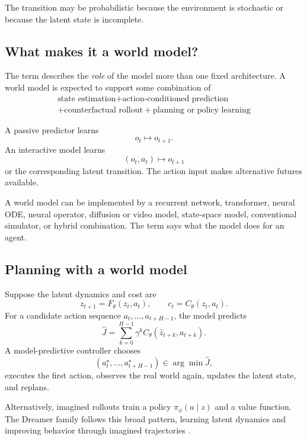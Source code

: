 \documentclass[11pt]{article}
\begin{document}
The transition may be probabilistic because the environment is stochastic or because the latent state is incomplete.

\subsection{What makes it a world model?}

The term describes the \emph{role} of the model more than one fixed architecture. A world model is expected to support some combination of
\[
\boxed{
\begin{gathered}
\text{state estimation}
+
\text{action-conditioned prediction}\\
+
\text{counterfactual rollout}
+
\text{planning or policy learning}
\end{gathered}
}
\]

A passive predictor learns
\[
 o_t\longmapsto o_{t+1}.
\]
An interactive model learns
\[
 (o_t,a_t)\longmapsto o_{t+1}
\]
or the corresponding latent transition. The action input makes alternative futures available.

A world model can be implemented by a recurrent network, transformer, neural ODE, neural operator, diffusion or video model, state-space model, conventional simulator, or hybrid combination. The term says what the model does for an agent.

\subsection{Planning with a world model}

Suppose the latent dynamics and cost are
\[
 z_{t+1}=F_\theta(z_t,a_t),
 \qquad
 c_t=C_\theta(z_t,a_t).
\]
For a candidate action sequence \(a_t,\ldots,a_{t+H-1}\), the model predicts
\begin{equation}
 \widehat J
 =\sum_{k=0}^{H-1}\gamma^k
 C_\theta(\widehat z_{t+k},a_{t+k}).
\end{equation}
A model-predictive controller chooses
\begin{equation}
 (a_t^\star,\ldots,a_{t+H-1}^\star)
 \in\arg\min\widehat J,
\end{equation}
executes the first action, observes the real world again, updates the latent state, and replans.

Alternatively, imagined rollouts train a policy \(\pi_\phi(a\mid z)\) and a value function. The Dreamer family follows this broad pattern, learning latent dynamics and improving behavior through imagined trajectories \citep{hafner2023dreamerv3}.
\end{document}
